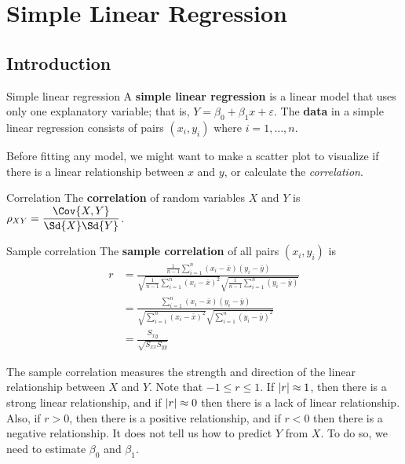\chapter{Simple Linear Regression}
\section{Introduction}
\begin{Definition}{Simple linear regression}{}
    A \textbf{simple linear regression}
    is a linear model that uses only one
    explanatory variable; that is,
    $ Y=\beta_0+\beta_1x+\varepsilon $.
    The \textbf{data}
    in a simple linear regression consists of pairs $ (x_i,y_i) $
    where $ i=1,\ldots,n $.
\end{Definition}
\begin{Remark}{}{}
    Before fitting any model, we might want
    to make a scatter plot to visualize if there
    is a linear relationship between $ x $ and $ y $,
    or calculate the \emph{correlation}.
\end{Remark}
\begin{Definition}{Correlation}{}
    The \textbf{correlation} of
    random variables $ X $ and $ Y $ is
    $ \rho_{XY}=\dfrac{\Cov{X,Y}}{\Sd{X}\Sd{Y}} $.
\end{Definition}
\begin{Definition}{Sample correlation}{}
    The \textbf{sample correlation} of
    all pairs $ (x_i,y_i) $ is
    \begin{align*}
        r
         & =\frac{\frac{1}{n-1} \sum_{i=1}^{n}(x_i-\bar{x})(y_i-\bar{y})}
        {\sqrt{\frac{1}{n-1}\sum_{i=1}^{n} (x_i-\bar{x})^2}
        \sqrt{\frac{1}{n-1}\sum_{i=1}^{n}(y_i-\bar{y})}}                  \\
         & =\frac{\sum_{i=1}^{n} (x_i-\bar{x})(y_i-\bar{y})}{
            \sqrt{\sum_{i=1}^{n} (x_i-\bar{x})^2}
            \sqrt{\sum_{i=1}^{n} (y_i-\bar{y})^2}
        }                                                                 \\
         & =\frac{S_{xy}}{\sqrt{S_{xx}S_{yy}}}
    \end{align*}
\end{Definition}
\begin{Remark}{}{}
    The sample correlation measures the strength and direction of
    the linear relationship between $ X $ and $ Y $. Note
    that $ -1\leqslant r\leqslant 1 $.
    If $ \lvert r\rvert\approx 1 $, then
    there is a strong linear relationship, and if
    $ \lvert r\rvert\approx 0 $
    then there is a lack of linear relationship. Also, if $ r>0 $,
    then there is a positive relationship, and if $ r<0 $
    then there is a negative relationship.
    It does not tell us how to predict $ Y $ from $ X $. To do so,
    we need to estimate $ \beta_0 $ and $ \beta_1 $.
\end{Remark}

